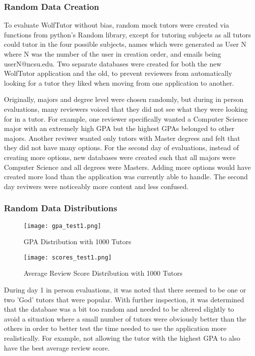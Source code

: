 \subsubsection{Random Data Creation}
\label{mock-data}
To evaluate WolfTutor without bias, random mock tutors were 
created via functions from python's Random library, except for
tutoring subjects as all tutors could tutor in the four possible subjects,
names which were generated as User N where N was the number of the 
user in creation order, and emails being userN@ncsu.edu. Two 
separate databases were created for both the new WolfTutor application
and the old, to prevent reviewers from automatically looking for a tutor
they liked when moving from one application to another.

Originally, majors and degree level were chosen randomly, but
during in person evaluations, many reviewers voiced that they did not
see what they were looking for in a tutor. For example, one reviewer specifically wanted
a Computer Science major with an extremely high GPA but the highest GPAs 
belonged to other majors. Another reviwer wanted only tutors with Master degrees
and felt that they did not have many options. For the second day of 
evaluations, instead of creating more options, new databases were created such that all majors
were Computer Science and all degrees were Masters. Adding more options
would have created more load than the application was currently able to handle.
The second day reviwers were noticeably more content and less confused.


\subsubsection{Random Data Distributions}

\begin{figure}[t]
\caption{GPA Distribution with 1000 Tutors}
\texttt{[image: gpa\_test1.png]}
\label{fig:gpa}
\end{figure}

\begin{figure}[t]
\caption{Average Review Score Distribution with 1000 Tutors}
\texttt{[image: scores\_test1.png]}
\label{fig:scores}
\end{figure}

During day 1 in person evaluations, it was noted that there
seemed to be one or two 'God' tutors that were popular. With
further inspection, it was determined that the database was a bit
too random and needed to be altered slightly to avoid a situation where a 
small number of tutors were obviously better than the others in order
to better test the time needed to use the application more realistically.
For example, not allowing the tutor with the highest GPA to also have the
best average review score.

